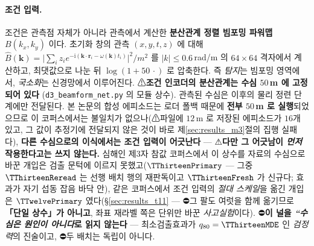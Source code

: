 \documentclass[11pt]{report}
\numberwithin{equation}{chapter}
\numberwithin{figure}{chapter}
\numberwithin{table}{chapter}
\begin{document}
\paragraph{조건 입력.}
조건은 관측점 자체가 아니라 관측에서 계산한 \textbf{분산관계 정렬 빔포밍 파워맵}
$B(k_x,k_y)$ 이다. 초기화 창의 관측 $(x,y,t,z)$ 에 대해
$\hat{B}(\mathbf{k}) = \bigl|\sum_i z_i e^{-\mathrm{i}(\mathbf{k}\cdot\mathbf{r}_i -
\omega(\mathbf{k}) t_i)}\bigr|^2 / m^2$ 를 $|k| \le 0.6$\,rad/m 의 $64\times64$ 격자에서
계산하고, 최댓값으로 나눈 뒤 $\log(1+50\,\cdot)$ 로 압축한다.
즉 \emph{탐지}는 빔포밍 영역에서, \emph{국소화}는 신경망에서 이루어진다.
⚠\textbf{조건 인코더의 분산관계는 수심 $50$\,m 에 고정되어 있다}
(\texttt{d3\_beamform\_net.py} 의 모듈 상수). 관측된 수심은 이후의 물리 정련 단계에만
전달된다.
본 논문의 합성 에피소드는 로더 폴백 때문에 \textbf{전부 $50$\,m 로 실행}되었으므로
이 코퍼스에서는 불일치가 없으나(⚠파일에 $12$\,m 로 저장된 에피소드가 $16$개 있고,
그 값이 추정기에 전달되지 않은 것이 바로 제\ref{sec:results_m3}절의 집행 실패다),
\textbf{다른 수심으로의 이식에서는 조건 입력이 어긋난다} --- ⚠\textbf{다만 그 어긋남이
\emph{먼저} 작용한다고는 쓰지 않는다.} 심해인 제3자 참값 코퍼스에서 이 상수를 자료의
수심으로 바꾼 개입은 검출 문턱에 이르지 못했고($\TThirteenPrimary$ --- 그중
$\TThirteenReread$ 는 선행 배치 행의 재판독이고 $\TThirteenFresh$ 가 신규다;
효과가 자기 섭동 잡음 바닥 안), 같은 코퍼스에서 조건 입력의 \emph{절대 스케일}을 옮긴
개입은 $\TTwelvePrimary$ 였다(\S\ref{sec:results_t11} --- ⛔그 팔도 여럿을 함께 옮기므로
\textbf{「단일 상수」가 아니고}, 좌표 재라벨 쪽은 단위만 바꾼 \emph{사고실험}이다).
⛔\textbf{이 널을 \emph{``수심은 원인이 아니다}로 읽지 않는다} --- 최소검출효과가
$q_{80} = \TThirteenMDE$ 인 \emph{검정력}의 진술이고, ⛔두 배치는 독립이 아니다.
\end{document}
